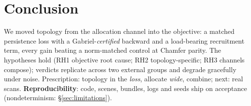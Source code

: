 \section{Conclusion}
\label{sec:conclusion}


We moved topology from the allocation channel into the objective: a
matched persistence loss with a Gabriel-\emph{certified} backward and a
load-bearing recruitment term, every gain beating a norm-matched
control at Chamfer parity. The hypotheses hold (RH1 objective root
cause; RH2 topology-specific; RH3 channels compose); verdicts
replicate across two external groups and degrade gracefully under
noise. Prescription: topology in the \emph{loss}, allocate \emph{wide},
combine; next: real scans.
\textbf{Reproducibility}: code, scenes, bundles, logs and seeds ship
on acceptance (nondeterminism: \S\ref{sec:limitations}).
